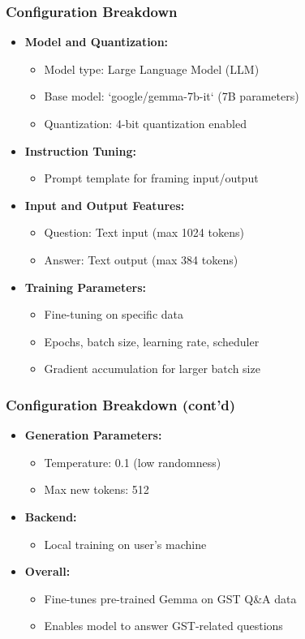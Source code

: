 \begin{frame}[fragile]\frametitle{Configuration Breakdown}
\begin{itemize}
\item \textbf{Model and Quantization:}
    \begin{itemize}
    \item Model type: Large Language Model (LLM)
    \item Base model: `google/gemma-7b-it` (7B parameters)
    \item Quantization: 4-bit quantization enabled
    \end{itemize}
\item \textbf{Instruction Tuning:}
    \begin{itemize}
    \item Prompt template for framing input/output
    \end{itemize}
\item \textbf{Input and Output Features:}
    \begin{itemize}
    \item Question: Text input (max 1024 tokens)
    \item Answer: Text output (max 384 tokens)
    \end{itemize}
\item \textbf{Training Parameters:}
    \begin{itemize}
    \item Fine-tuning on specific data
    \item Epochs, batch size, learning rate, scheduler
    \item Gradient accumulation for larger batch size
    \end{itemize}
\end{itemize}
\end{frame}

\begin{frame}[fragile]\frametitle{Configuration Breakdown (cont'd)}
\begin{itemize}
\item \textbf{Generation Parameters:}
    \begin{itemize}
    \item Temperature: 0.1 (low randomness)
    \item Max new tokens: 512
    \end{itemize}
\item \textbf{Backend:}
    \begin{itemize}
    \item Local training on user's machine
    \end{itemize}
\item \textbf{Overall:}
    \begin{itemize}
    \item Fine-tunes pre-trained Gemma on GST Q\&A data
    \item Enables model to answer GST-related questions
    \end{itemize}
\end{itemize}
\end{frame}

